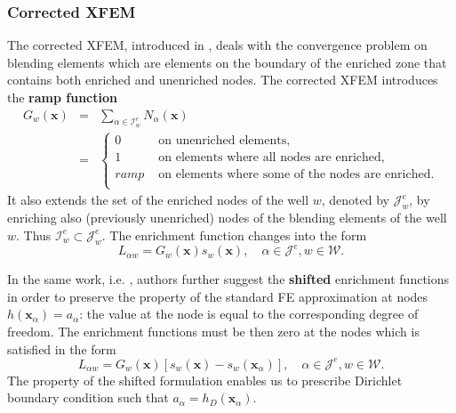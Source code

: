 \documentclass{elsarticle}
\def\vc#1{\mathbf{\boldsymbol{#1}}}     %
\newcommand{\bx}{\vc{x}}
\begin{document}
\subsubsection{Corrected XFEM}
The corrected XFEM, introduced in  \cite{fries_corrected_2008}, deals with the convergence problem on blending elements
which are elements on the boundary of the enriched zone that contains both enriched and unenriched nodes.
The corrected XFEM introduces the \textbf{ramp function}
\begin{eqnarray} \label{eqn:ramp_function}
  G_w(\bx) &=& \sum_{\alpha\in\mathcal{I}_w^e} N_\alpha(\bx)    \\
  &=& 
  \begin{cases}
    0 & \textrm{ on unenriched elements,}    \\
    1 & \textrm{ on elements where all nodes are enriched,}    \\
    ramp & \textrm{ on elements where some of the nodes are enriched.}    \\
  \end{cases} \nonumber
\end{eqnarray}
It also extends the set of the enriched nodes of the well $w$, denoted by $\mathcal{J}^e_w$, by enriching also (previously unenriched) nodes 
of the blending elements of the well $w$. Thus $\mathcal{I}^e_w\subset\mathcal{J}^e_w$.
The enrichment function changes into the form
\begin{equation} \label{eqn:xfem_ramp}
    L_{\alpha w} = G_w(\bx) s_{w}(\bx), \quad \alpha\in\mathcal{J}^e, w\in\mathcal{W}.
\end{equation}


In the same work, i.e. \cite{fries_corrected_2008}, authors further suggest the \textbf{shifted} enrichment functions in order 
to preserve the property of the standard 
FE approximation at nodes $h(\bx_\alpha)=a_\alpha$: the value at the node is equal to the corresponding degree
of freedom. The enrichment functions must be then zero at the nodes which is satisfied in the form
\begin{equation} \label{eqn:xfem_shift}
    L_{\alpha w} = G_w(\bx) \left[s_w(\bx) - s_w(\bx_\alpha)\right],
    \quad \alpha\in\mathcal{J}^e, w\in\mathcal{W}.
\end{equation} 
The property of the shifted formulation enables us to prescribe Dirichlet boundary condition such that
$a_\alpha = h_D(\bx_\alpha)$.
\end{document}
